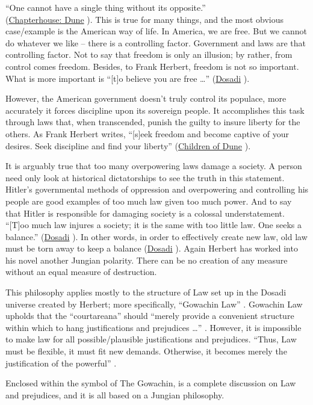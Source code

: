 \documentclass[14pt, a4paper, onecolumn]{extreport}
\begin{document}
``One cannot have a single thing without its opposite.'' \\(\underline{Chapterhouse: Dune} \cite{Chapterhouse:171}). This is true for many things, and the most obvious case/example is the American way of life. In America, we are free. But we cannot do whatever we like -- there is a controlling factor. Government and laws are that controlling factor. Not to say that freedom is only an illusion; by rather, from control comes freedom. Besides, to Frank Herbert, freedom is not so important. What is more important is ``[t]o believe you are free \dots'' (\underline{Dosadi} \cite{Dosadi:75}).

However, the American government doesn't truly control its populace, more accurately it forces discipline upon its sovereign people. It accomplishes this task through laws that, when transcended, punish the guilty to insure liberty for the others. As Frank Herbert writes, ``[s]eek freedom and become captive of your desires. Seek discipline and find your liberty'' (\underline{Children of Dune} \cite{Children:344}).

It is arguably true that too many overpowering laws damage a society. A person need only look at historical dictatorships to see the truth in this statement. Hitler's governmental methods of oppression and overpowering and controlling his people are good examples of too much law given too much power. And to say that Hitler is responsible for damaging society is a colossal understatement. ``[T]oo much law injures a society; it is the same with too little law. One seeks a balance.'' (\underline{Dosadi} \cite{Dosadi:125}). In other words, in order to effectively create new law, old law must be torn away to keep a balance (\underline{Dosadi} \cite{Dosadi:125}). Again Herbert has worked into his novel another Jungian polarity. There can be no creation of any measure without an equal measure of destruction.

This philosophy applies mostly to the structure of Law set up in the Dosadi universe created by Herbert; more specifically, ``Gowachin Law'' \cite{Dosadi:160}. Gowachin Law upholds that the ``courtareana'' should ``merely provide a convenient structure within which to hang justifications and prejudices \dots'' \cite{Dosadi:160}. However, it is impossible to make law for all possible/plausible justifications and prejudices. ``Thus, Law must be flexible, it must fit new demands. Otherwise, it becomes merely the justification of the powerful'' \cite{Dosadi:160}.

Enclosed within the symbol of The Gowachin, is a complete discussion on Law and prejudices, and it is all based on a Jungian philosophy.
\end{document}
